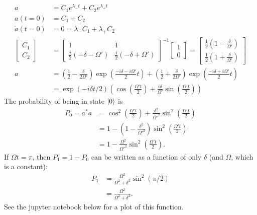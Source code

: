 \documentclass{article}
\begin{document}
\begin{align*}
    a &= C_1 e^{\lambda_- t}+C_2 e^{\lambda_+ t} \\
    a(t=0) &= C_1+C_2 \\
    \dot{a}(t=0) &= 0 = \lambda_- C_1 + \lambda_+ C_2 \\
    \begin{bmatrix}
        C_1 \\
        C_2
    \end{bmatrix} &= \begin{bmatrix}
    1 & 1 \\
    \frac{i}{2} (-\delta -\Omega') & \frac{i}{2} (-\delta + \Omega')
\end{bmatrix}^{-1} \begin{bmatrix}
    1 \\
    0
\end{bmatrix} = \begin{bmatrix}
\frac{1}{2} \left( 1 - \frac{\delta}{\Omega'} \right) \\
\frac{1}{2} \left( 1 + \frac{\delta}{\Omega'} \right) 
\end{bmatrix} \\
    a &= \left( \frac{1}{2} - \frac{\delta}{2\Omega'} \right) \exp \left( \frac{-i \delta - i \Omega'}{2} t \right) + \left( \frac{1}{2} + \frac{\delta}{2\Omega'} \right) \exp \left( \frac{-i \delta + i \Omega'}{2} t \right) \\
      &= \exp (-i\delta t/ 2) \left( \cos \left( \frac{\Omega't}{2} \right) + \frac{i\delta}{\Omega'} \sin \left( \frac{\Omega't}{2} \right)  \right) 
\end{align*}
The probability of being in state $\left\lvert 0 \right\rangle$ is
\begin{align*}
    P_0 = a^*a &= \cos^2 \left( \frac{\Omega't}{2} \right) + \frac{\delta^2}{\Omega'^2} \sin^2 \left( \frac{\Omega't}{2} \right) \\
               &= 1 - \left( 1 - \frac{\delta^2}{\Omega'^2} \right) \sin^2 \left( \frac{\Omega't}{2} \right) \\
               &= 1 - \frac{\Omega^2}{\Omega'^2} \sin^2 \left( \frac{\Omega't}{2} \right).
\end{align*}
If $\Omega t = \pi$, then $P_1 = 1 - P_0$ can be written as a function of only $\delta$ (and $\Omega$, which is a constant):
\begin{align*}
    P_1 &= \frac{\Omega^2}{\Omega^2 + \delta^2} \sin^2 (\pi/2) \\
        &= \frac{\Omega^2}{\Omega^2 + \delta^2}.
\end{align*}
See the jupyter notebook below for a plot of this function.

\bigskip


\end{document}
